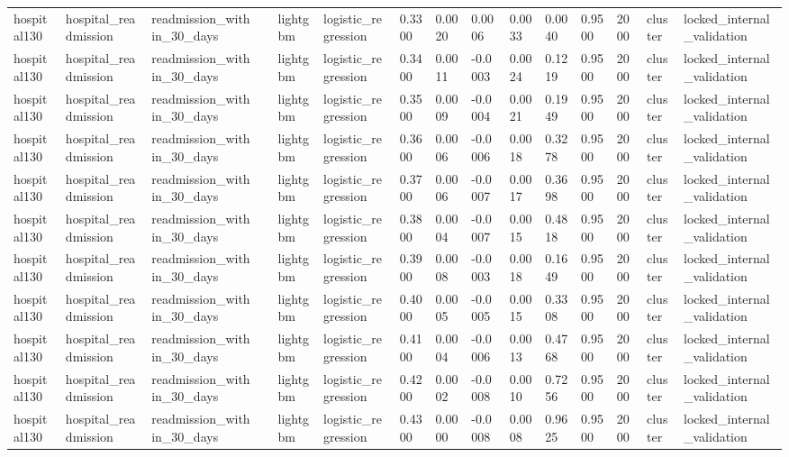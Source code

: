 \begin{tabular}{lllllllllllllll}
hospital130 & hospital\_readmission & readmission\_within\_30\_days &  & lightgbm & logistic\_regression & 0.3300 & 0.0020 & 0.0006 & 0.0033 & 0.0040 & 0.9500 & 2000 & cluster & locked\_internal\_validation \\
hospital130 & hospital\_readmission & readmission\_within\_30\_days &  & lightgbm & logistic\_regression & 0.3400 & 0.0011 & -0.0003 & 0.0024 & 0.1219 & 0.9500 & 2000 & cluster & locked\_internal\_validation \\
hospital130 & hospital\_readmission & readmission\_within\_30\_days &  & lightgbm & logistic\_regression & 0.3500 & 0.0009 & -0.0004 & 0.0021 & 0.1949 & 0.9500 & 2000 & cluster & locked\_internal\_validation \\
hospital130 & hospital\_readmission & readmission\_within\_30\_days &  & lightgbm & logistic\_regression & 0.3600 & 0.0006 & -0.0006 & 0.0018 & 0.3278 & 0.9500 & 2000 & cluster & locked\_internal\_validation \\
hospital130 & hospital\_readmission & readmission\_within\_30\_days &  & lightgbm & logistic\_regression & 0.3700 & 0.0006 & -0.0007 & 0.0017 & 0.3698 & 0.9500 & 2000 & cluster & locked\_internal\_validation \\
hospital130 & hospital\_readmission & readmission\_within\_30\_days &  & lightgbm & logistic\_regression & 0.3800 & 0.0004 & -0.0007 & 0.0015 & 0.4818 & 0.9500 & 2000 & cluster & locked\_internal\_validation \\
hospital130 & hospital\_readmission & readmission\_within\_30\_days &  & lightgbm & logistic\_regression & 0.3900 & 0.0008 & -0.0003 & 0.0018 & 0.1649 & 0.9500 & 2000 & cluster & locked\_internal\_validation \\
hospital130 & hospital\_readmission & readmission\_within\_30\_days &  & lightgbm & logistic\_regression & 0.4000 & 0.0005 & -0.0005 & 0.0015 & 0.3308 & 0.9500 & 2000 & cluster & locked\_internal\_validation \\
hospital130 & hospital\_readmission & readmission\_within\_30\_days &  & lightgbm & logistic\_regression & 0.4100 & 0.0004 & -0.0006 & 0.0013 & 0.4768 & 0.9500 & 2000 & cluster & locked\_internal\_validation \\
hospital130 & hospital\_readmission & readmission\_within\_30\_days &  & lightgbm & logistic\_regression & 0.4200 & 0.0002 & -0.0008 & 0.0010 & 0.7256 & 0.9500 & 2000 & cluster & locked\_internal\_validation \\
hospital130 & hospital\_readmission & readmission\_within\_30\_days &  & lightgbm & logistic\_regression & 0.4300 & 0.0000 & -0.0008 & 0.0008 & 0.9625 & 0.9500 & 2000 & cluster & locked\_internal\_validation \\

\end{tabular}
